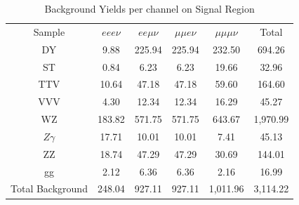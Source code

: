 \begin{table}
  \caption{Background Yields per
    channel on Signal Region}
 \begin{center}
 \begin{tabular}{cccccc}\hline\hline
Sample & $eee\nu$ & $ee\mu\nu$ & $\mu\mu e\nu$ & $\mu\mu\mu\nu$ & Total \\
DY & 9.88 & 225.94 & 225.94 & 232.50 & 694.26 \\
ST & 0.84 & 6.23 & 6.23 & 19.66 & 32.96 \\
TTV & 10.64 & 47.18 & 47.18 & 59.60 & 164.60 \\
VVV & 4.30 & 12.34 & 12.34 & 16.29 & 45.27 \\
WZ & 183.82 & 571.75 & 571.75 & 643.67 & 1,970.99 \\
$Z\gamma$ & 17.71 & 10.01 & 10.01 & 7.41 & 45.13 \\
ZZ & 18.74 & 47.29 & 47.29 & 30.69 & 144.01 \\
gg & 2.12 & 6.36 & 6.36 & 2.16 & 16.99 \\ \hline
Total Background & 248.04 & 927.11 & 927.11 & 1,011.96 & 3,114.22 \\ \hline
 \end{tabular}
 \end{center}
 \label{tab:BackgroundYieldsSR}
\end{table}
